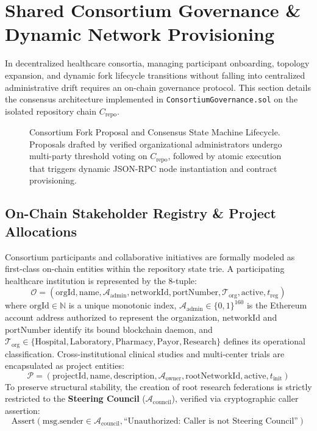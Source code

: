 \section{Shared Consortium Governance \& Dynamic Network Provisioning}
\label{sec:governance_consensus}

In decentralized healthcare consortia, managing participant onboarding, topology expansion, and dynamic fork lifecycle transitions without falling into centralized administrative drift requires an on-chain governance protocol. This section details the consensus architecture implemented in \texttt{ConsortiumGovernance.sol} on the isolated repository chain $C_{\text{repo}}$.

\begin{figure}[t]
\centering

\caption{Consortium Fork Proposal and Consensus State Machine Lifecycle. Proposals drafted by verified organizational administrators undergo multi-party threshold voting on $C_{\text{repo}}$, followed by atomic execution that triggers dynamic JSON-RPC node instantiation and contract provisioning.}
\label{fig:governance_state}
\end{figure}

\subsection{On-Chain Stakeholder Registry \& Project Allocations}
Consortium participants and collaborative initiatives are formally modeled as first-class on-chain entities within the repository state trie. A participating healthcare institution is represented by the 8-tuple:
\begin{equation}
\mathcal{O} = (\text{orgId}, \text{name}, \mathcal{A}_{\text{admin}}, \text{networkId}, \text{portNumber}, \mathcal{T}_{\text{org}}, \text{active}, t_{\text{reg}})
\end{equation}
where $\text{orgId} \in \mathbb{N}$ is a unique monotonic index, $\mathcal{A}_{\text{admin}} \in \{0,1\}^{160}$ is the Ethereum account address authorized to represent the organization, $\text{networkId}$ and $\text{portNumber}$ identify its bound blockchain daemon, and $\mathcal{T}_{\text{org}} \in \{\text{Hospital}, \text{Laboratory}, \text{Pharmacy}, \text{Payor}, \text{Research}\}$ defines its operational classification. Cross-institutional clinical studies and multi-center trials are encapsulated as project entities:
\begin{equation}
\mathcal{P} = (\text{projectId}, \text{name}, \text{description}, \mathcal{A}_{\text{owner}}, \text{rootNetworkId}, \text{active}, t_{\text{init}})
\end{equation}
To preserve structural stability, the creation of root research federations is strictly restricted to the \textbf{Steering Council} ($\mathcal{A}_{\text{council}}$), verified via cryptographic caller assertion:
\begin{equation}
\text{Assert}\left(\text{msg.sender} \in \mathcal{A}_{\text{council}}, \text{``Unauthorized: Caller is not Steering Council''}\right)
\end{equation}

